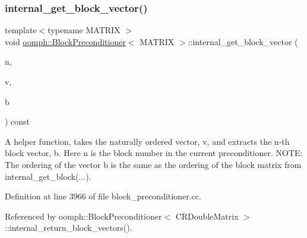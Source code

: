 \subsubsection{\texorpdfstring{internal\+\_\+get\+\_\+block\+\_\+vector()}{internal\_get\_block\_vector()}}
{\footnotesize\ttfamily template$<$typename M\+A\+T\+R\+IX $>$ \\
void \hyperlink{classoomph_1_1BlockPreconditioner}{oomph\+::\+Block\+Preconditioner}$<$ M\+A\+T\+R\+IX $>$\+::internal\+\_\+get\+\_\+block\+\_\+vector (\begin{DoxyParamCaption}\item[{const unsigned \&}]{n,  }\item[{const \hyperlink{classoomph_1_1DoubleVector}{Double\+Vector} \&}]{v,  }\item[{\hyperlink{classoomph_1_1DoubleVector}{Double\+Vector} \&}]{b }\end{DoxyParamCaption}) const}



A helper function, takes the naturally ordered vector, v, and extracts the n-\/th block vector, b. Here n is the block number in the current preconditioner. N\+O\+TE\+: The ordering of the vector b is the same as the ordering of the block matrix from internal\+\_\+get\+\_\+block(...). 



Definition at line 3966 of file block\+\_\+preconditioner.\+cc.



Referenced by oomph\+::\+Block\+Preconditioner$<$ C\+R\+Double\+Matrix $>$\+::internal\+\_\+return\+\_\+block\+\_\+vectors().

\mbox{\label{classoomph_1_1BlockPreconditioner_ace6e9dbdfe9a1c3571452e2cd6ec9780}} 

